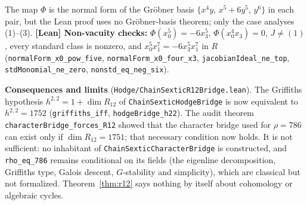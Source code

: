 \documentclass[11pt]{amsart}
\theoremstyle{remark}\newtheorem{remark}[theorem]{Remark}
\begin{document}
The map $\Phi$ is the normal form of the Gr\"obner basis $\{x^4y,\,x^5+6y^5,\,y^6\}$
in each pair, but the Lean proof uses no Gr\"obner-basis theorem; only the case analyses
(1)--(3). \textbf{[Lean] Non-vacuity checks:} $\Phi(x_0^5)=-6x_3^5$, $\Phi(x_0^4x_3)=0$,
$J\ne(1)$, every standard class is nonzero, and $x_0^5x_1^7=-6x_3^5x_1^7$ in $R$
(\texttt{normalForm\_x0\_pow\_five}, \texttt{normalForm\_x0\_four\_x3}, \texttt{jacobianIdeal\_ne\_top},
\texttt{stdMonomial\_ne\_zero}, \texttt{nonstd\_eq\_neg\_six}).

\textbf{Consequences and limits} (\texttt{Hodge/ChainSexticR12Bridge.lean}). The
Griffiths hypothesis $h^{2,2}=1+\dim R_{12}$ of \texttt{ChainSexticHodgeBridge} is now
equivalent to $h^{2,2}=1752$ (\texttt{griffiths\_iff}, \texttt{hodgeBridge\_h22}).
The audit theorem \texttt{characterBridge\_forces\_R12} showed that the character
bridge used for $\rho=786$ can exist only if $\dim R_{12}=1751$; that necessary condition
now holds. It is not sufficient: no inhabitant of \texttt{ChainSexticCharacterBridge}
is constructed, and \texttt{rho\_eq\_786} remains conditional on its fields (the
eigenline decomposition, Griffiths type, Galois descent, $G$-stability and simplicity),
which are classical but not formalized. Theorem~\ref{thm:r12} says nothing by itself about
cohomology or algebraic cycles.
\end{document}
